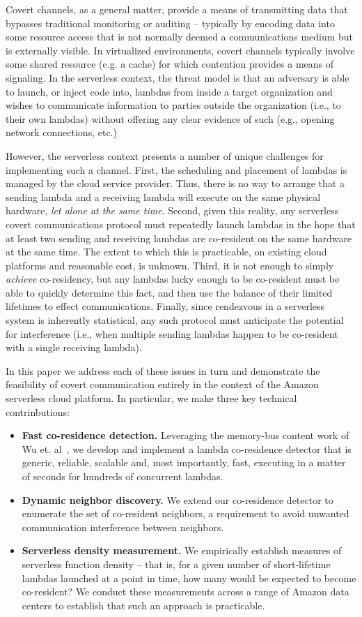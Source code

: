 Covert channels, as a general matter, provide a means of transmitting
data that bypasses traditional monitoring or auditing -- typically by
encoding data into some resource access that is not normally deemed a
communications medium but is externally visible.  In virtualized
environments, covert channels typically involve some shared resource
(e.g. a cache) for which contention provides a means of signaling.
In the serverless context, the threat model is that an adversary is
able to launch, or inject code into, lambdas from inside a target
organization and wishes to communicate information to parties outside
the organization (i.e., to their own lambdas) without offering any
clear evidence of such (e.g., opening network connections, etc.)

However, the serverless context presents a number of unique challenges for
implementing such a channel.  First, the scheduling and placement of lambdas is
managed by the cloud service provider.  Thus, there is no way to arrange that a
sending lambda and a receiving lambda will execute on the same physical
hardware, \emph{let alone at the same time}.  Second, given this reality, any
serverless covert communications protocol must repeatedly launch lambdas in the
hope that at least two sending and receiving lambdas are co-resident on the same
hardware at the same time.  The extent to which this is practicable, on existing
cloud platforms and reasonable cost, is unknown.  Third, it is not enough to
simply \emph{achieve} co-residency, but any lambdas lucky enough to be
co-resident must be able to quickly determine this fact, and then use the
balance of their limited lifetimes to effect communications.  Finally, since
rendezvous in a serverless system is inherently statistical, any such protocol
must anticipate the potential for interference (i.e., when multiple sending
lambdas happen to be co-resident with a single receiving lambda).

In this paper we address each of these issues in turn and demonstrate
the feasibility of covert communication entirely in the context of the
Amazon serverless cloud platform.  In particular, we make three key technical
contrinbutions:
\begin{itemize}
\item{\bf{Fast co-residence detection.}}  Leveraging the memory-bus content
  work of Wu et. al~\cite{wuusenix2012}, we develop and implement a
  lambda co-residence detector that is generic, reliable, scalable
  and, most importantly, fast, executing in a matter of seconds for hundreds of
  concurrent lambdas.
\item{\bf{Dynamic neighbor discovery.}}  We extend our co-residence
  detector to enumerate the set of co-resident neighbors, a
  requirement to avoid unwanted communication interference between
  neighbors.
\item{\bf{Serverless density measurement.}}  We empirically establish
  measures of serverless function density -- that is, for a given
  number of short-lifetime lambdas launched at a point in time, how
  many would be expected to become co-resident?  We conduct these
  measurements across a range of Amazon data centers to establish that
  such an approach is practicable.
\end{itemize}

